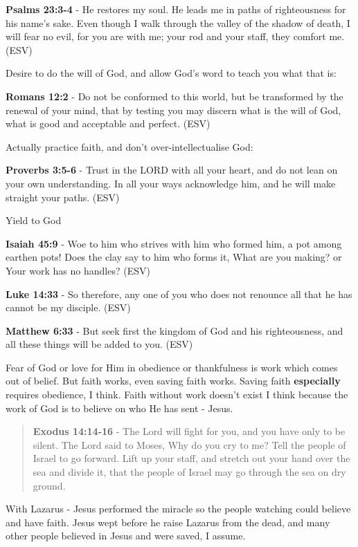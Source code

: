 \documentclass[11pt]{article}
\begin{document}
\textbf{Psalms 23:3-4} - He restores my soul. He leads me in paths of righteousness for his name's sake. Even though I walk through the valley of the shadow of death, I will fear no evil, for you are with me; your rod and your staff, they comfort me. (ESV)

Desire to do the will of God, and allow God's word to teach you what that is:

\textbf{Romans 12:2} - Do not be conformed to this world, but be transformed by the renewal of your mind, that by testing you may discern what is the will of God, what is good and acceptable and perfect. (ESV)

Actually practice faith, and don't over-intellectualise God:

\textbf{Proverbs 3:5-6} - Trust in the LORD with all your heart, and do not lean on your own understanding. In all your ways acknowledge him, and he will make straight your paths. (ESV)

Yield to God

\textbf{Isaiah 45:9} - Woe to him who strives with him who formed him, a pot among earthen pots! Does the clay say to him who forms it, What are you making? or Your work has no handles? (ESV)

\textbf{Luke 14:33} - So therefore, any one of you who does not renounce all that he has cannot be my disciple. (ESV)

\textbf{Matthew 6:33} - But seek first the kingdom of God and his righteousness, and all these things will be added to you. (ESV)

Fear of God or love for Him in obedience or thankfulness is work which comes out of belief.
But faith works, even saving faith works. Saving faith \textbf{especially} requires obedience, I think.
Faith without work doesn't exist I think because the work of God is to believe on who He has sent - Jesus.

\begin{quote}
\textbf{Exodus 14:14-16} - The Lord will fight for you, and you have only to be silent.  The Lord said to Moses, Why do you cry to me? Tell the people of Israel to go forward.  Lift up your staff, and stretch out your hand over the sea and divide it, that the people of Israel may go through the sea on dry ground.
\end{quote}

With Lazarus - Jesus performed the miracle so the people watching could believe and have faith.
Jesus wept before he raise Lazarus from the dead, and many other people believed in Jesus and were saved, I assume.
\end{document}
